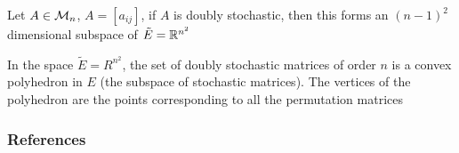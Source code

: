 \documentclass[aspectratio=169]{beamer}
\begin{document}
\begin{frame}
\begin{theorem}
 Let $A\in \mathcal{M}_{n}$, $A=[a_{ij}]$, if $A$ is doubly stochastic, then this forms an $(n-1)^2$ dimensional subspace of $\tilde{E}= \mathbb{R}^{n^2}$
\end{theorem}
\vfill
\begin{theorem}[Birkhoff]
In the space $\tilde{E}=R^{n^2}$, the set of doubly stochastic matrices of order $n$ is a convex polyhedron in $E$ (the subspace of stochastic matrices). The vertices of the polyhedron are the points corresponding to all the permutation matrices
\end{theorem}
\end{frame}


\begin{frame}[allowframebreaks]
    \frametitle{References}
    
    
\end{frame}
    
\end{document}
